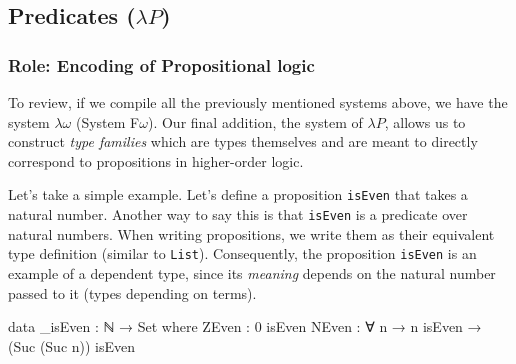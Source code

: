\documentclass[12pt]{article}
\begin{document}
\subsection*{Predicates (\(\lambda P\))}
\subsubsection*{Role: Encoding of Propositional logic}

To review, if we compile all the previously mentioned systems above, we have
the system \(\lambda\omega\) (System F\(\omega\)). Our final addition, the
system of \(\lambda P\), allows us to construct {\em type families} which are
types themselves and are meant to directly correspond to propositions in
higher-order logic.

Let's take a simple example. Let's define a proposition {\tt isEven} that takes
a natural number. Another way to say this is that {\tt isEven} is a predicate
over natural numbers. When writing propositions, we write them as their equivalent
type definition (similar to {\tt List}). Consequently, the proposition
{\tt isEven} is an example of a dependent type, since its {\em meaning} depends
on the natural number passed to it (types depending on terms).

\begin{center}
\begin{minipage}{0.7\textwidth}
\begin{code}
data _isEven : ℕ → Set where
  ZEven : 0 isEven
  NEven : ∀ n → n isEven → (Suc (Suc n)) isEven
\end{code}
\end{minipage}
\end{center}
\end{document}
